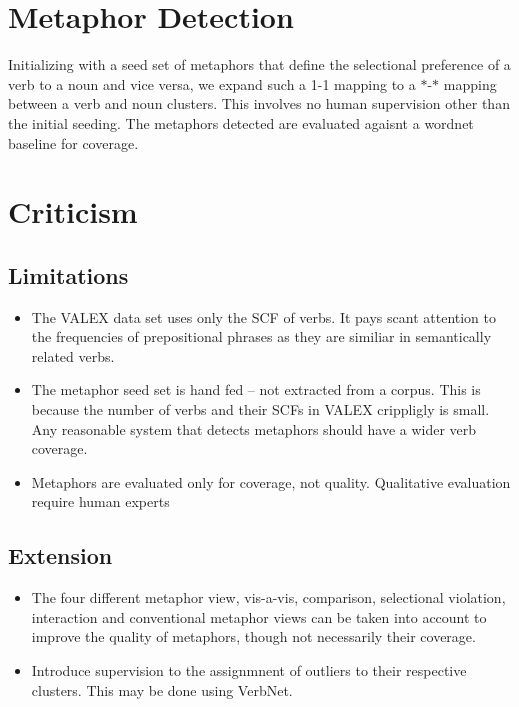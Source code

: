 \section{Metaphor Detection}
Initializing with a seed set of metaphors that define the selectional preference of a verb to a noun and vice
versa, we expand such a 1-1 mapping to a $*$-$*$ mapping between a verb  and noun clusters. This involves 
no human supervision other than the initial seeding. The metaphors detected are evaluated agaisnt a wordnet
baseline for coverage. 

\section{Criticism}
\subsection{Limitations}
\begin{itemize}
\item The VALEX data set uses only the SCF of verbs. It pays scant attention to the frequencies of 
prepositional phrases as they are similiar in semantically related verbs. 
\item The metaphor seed set is hand fed -- not extracted from a corpus. This is because the number of verbs and their
 SCFs in VALEX crippligly is small. Any reasonable system that detects metaphors should have a wider verb coverage.
\item Metaphors are evaluated only for coverage, not quality. Qualitative evaluation require human experts
\end{itemize}

\subsection{Extension}
\begin{itemize}
\item The four different metaphor view, vis-a-vis, comparison, selectional violation, interaction and conventional
metaphor views can be taken into account to improve the quality of metaphors, though not necessarily their coverage.
\item Introduce supervision to the assignmnent of outliers to their respective clusters. This may be done using VerbNet.
\end{itemize}

